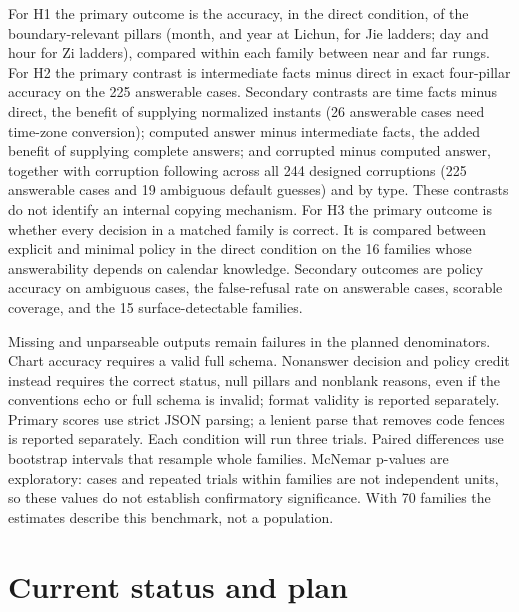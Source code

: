 \documentclass[12pt,letterpaper]{article}
\begin{document}
For H1 the primary outcome is the accuracy, in the direct condition, of the boundary-relevant pillars (month, and year at Lichun, for Jie ladders; day and hour for Zi ladders), compared within each family between near and far rungs. For H2 the primary contrast is intermediate facts minus direct in exact four-pillar accuracy on the 225 answerable cases. Secondary contrasts are time facts minus direct, the benefit of supplying normalized instants (26 answerable cases need time-zone conversion); computed answer minus intermediate facts, the added benefit of supplying complete answers; and corrupted minus computed answer, together with corruption following across all 244 designed corruptions (225 answerable cases and 19 ambiguous default guesses) and by type. These contrasts do not identify an internal copying mechanism. For H3 the primary outcome is whether every decision in a matched family is correct. It is compared between explicit and minimal policy in the direct condition on the 16 families whose answerability depends on calendar knowledge. Secondary outcomes are policy accuracy on ambiguous cases, the false-refusal rate on answerable cases, scorable coverage, and the 15 surface-detectable families.

Missing and unparseable outputs remain failures in the planned denominators. Chart accuracy requires a valid full schema. Nonanswer decision and policy credit instead requires the correct status, null pillars and nonblank reasons, even if the conventions echo or full schema is invalid; format validity is reported separately. Primary scores use strict JSON parsing; a lenient parse that removes code fences is reported separately. Each condition will run three trials. Paired differences use bootstrap intervals that resample whole families. McNemar p-values are exploratory: cases and repeated trials within families are not independent units, so these values do not establish confirmatory significance. With 70 families the estimates describe this benchmark, not a population.

\section{Current status and plan}
\end{document}
